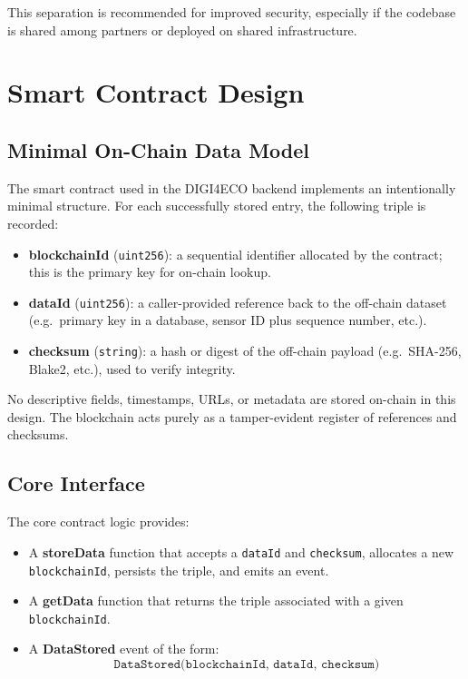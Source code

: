 \documentclass[11pt,a4paper]{article}
\begin{document}
This separation is recommended for improved security, especially if the codebase is shared among partners or deployed on shared infrastructure.

\section{Smart Contract Design}

\subsection{Minimal On-Chain Data Model}

The smart contract used in the DIGI4ECO backend implements an intentionally minimal structure. For each successfully stored entry, the following triple is recorded:

\begin{itemize}[noitemsep]
  \item \textbf{blockchainId} (\texttt{uint256}): a sequential identifier allocated by the contract; this is the primary key for on-chain lookup.
  \item \textbf{dataId} (\texttt{uint256}): a caller-provided reference back to the off-chain dataset (e.g.\ primary key in a database, sensor ID plus sequence number, etc.).
  \item \textbf{checksum} (\texttt{string}): a hash or digest of the off-chain payload (e.g.\ SHA-256, Blake2, etc.), used to verify integrity.
\end{itemize}

No descriptive fields, timestamps, URLs, or metadata are stored on-chain in this design. The blockchain acts purely as a tamper-evident register of references and checksums.

\subsection{Core Interface}

The core contract logic provides:

\begin{itemize}[noitemsep]
  \item A \textbf{storeData} function that accepts a \texttt{dataId} and \texttt{checksum}, allocates a new \texttt{blockchainId}, persists the triple, and emits an event.
  \item A \textbf{getData} function that returns the triple associated with a given \texttt{blockchainId}.
  \item A \textbf{DataStored} event of the form:
        \[
          \texttt{DataStored(blockchainId, dataId, checksum)}
        \]
\end{itemize}
\end{document}
